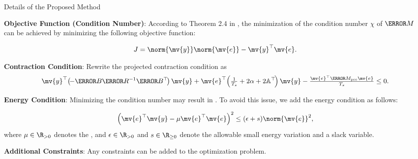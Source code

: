 \begin{frame}{\insertsubsectionhead}{Details of the Proposed Method}

\textbf{Objective Function (Condition Number)}:
According to Theorem 2.4 in \cite{Tsukamoto:2021aa}, the minimization of the condition number $\chi$ of $\mm{M}$ can be achieved by minimizing the following objective function:

    \begin{equation}
        J = \norm{\mv{y}}\norm{\mv{e}} - \mv{y}^\top \mv{e}
        .
    \end{equation}

   
    \textbf{Contraction Condition}:
Rewrite the projected contraction condition as
\begin{equation} \label{eq:cstr:ctrc:proj}
   \mv{y}^\top 
   \!
   \left(
   \!
      -\mm{B} \mm{R}^{-1} \mm{B}^\top
   \!
   \right)
   \mv{y}
   +
   \mv{e}^\top
   \!
   \left(
      \tfrac{1}{T_s}+2\alpha
      +
      2\mathbb{A}^\top
   \!
   \right)
   \mv{y}
   -
   \tfrac{\mv{e}^\top \mm{M}_{\rm{pre}} \mv{e}}{T_s}
   \le 0
   .
\end{equation}


    \textbf{Energy Condition}: Minimizing the condition number may result in . To avoid this issue, we add the energy condition as follows:

    \begin{equation} \label{eq:cstr:energy}
   \left(
      \mv{e}^\top \mv{y} 
      -
      \mu \mv{e}^\top \mv{e}
   \right)^2
   \le
   (\epsilon + s) \norm{\mv{e}}^2
   ,
\end{equation}
where $\mu\in\R_{>0}$ denotes the , and $\epsilon\in\R_{>0}$ and $s\in\R_{\ge0}$ denote the allowable small energy variation and a slack variable.



    \textbf{Additional Constraints}:
    Any constraints can be added to the optimization problem.
 
   \end{frame}

